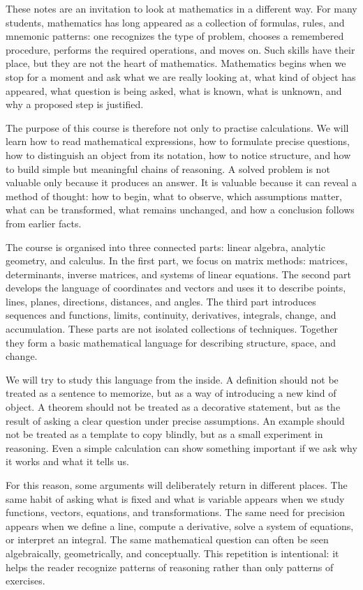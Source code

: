 These notes are an invitation to look at mathematics in a different way. For many students, mathematics has long appeared as a collection of formulas, rules, and mnemonic patterns: one recognizes the type of problem, chooses a remembered procedure, performs the required operations, and moves on. Such skills have their place, but they are not the heart of mathematics. Mathematics begins when we stop for a moment and ask what we are really looking at, what kind of object has appeared, what question is being asked, what is known, what is unknown, and why a proposed step is justified.

The purpose of this course is therefore not only to practise calculations. We will learn how to read mathematical expressions, how to formulate precise questions, how to distinguish an object from its notation, how to notice structure, and how to build simple but meaningful chains of reasoning. A solved problem is not valuable only because it produces an answer. It is valuable because it can reveal a method of thought: how to begin, what to observe, which assumptions matter, what can be transformed, what remains unchanged, and how a conclusion follows from earlier facts.

The course is organised into three connected parts: linear algebra, analytic geometry, and calculus. In the first part, we focus on matrix methods: matrices, determinants, inverse matrices, and systems of linear equations. The second part develops the language of coordinates and vectors and uses it to describe points, lines, planes, directions, distances, and angles. The third part introduces sequences and functions, limits, continuity, derivatives, integrals, change, and accumulation. These parts are not isolated collections of techniques. Together they form a basic mathematical language for describing structure, space, and change.

We will try to study this language from the inside. A definition should not be treated as a sentence to memorize, but as a way of introducing a new kind of object. A theorem should not be treated as a decorative statement, but as the result of asking a clear question under precise assumptions. An example should not be treated as a template to copy blindly, but as a small experiment in reasoning. Even a simple calculation can show something important if we ask why it works and what it tells us.

For this reason, some arguments will deliberately return in different places. The same habit of asking what is fixed and what is variable appears when we study functions, vectors, equations, and transformations. The same need for precision appears when we define a line, compute a derivative, solve a system of equations, or interpret an integral. The same mathematical question can often be seen algebraically, geometrically, and conceptually. This repetition is intentional: it helps the reader recognize patterns of reasoning rather than only patterns of exercises.

